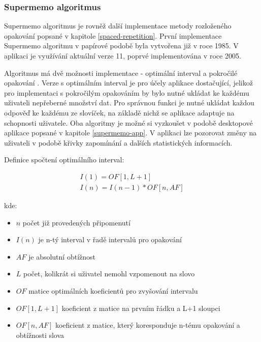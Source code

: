 \documentclass[a4paper,11pt,titlepage,fleqn]{article}
\begin{document}
        \subsubsection{Supermemo algoritmus}
            \label{supermemo}
            Supermemo algoritmus je rovněž další implementace metody rozloženého opakování popsané v kapitole \ref{spaced-repetition}. První implementace Supermemo algoritmu v papírové podobě byla vytvořena již v roce 1985. V aplikaci je využívání aktuální verze 11, poprvé implementována v roce 2005. 

            Algoritmus má dvě možnosti implementace - optimální interval a pokročilé opakování \cite{bib:supermemo}. Verze s optimálním interval je pro účely aplikace dostačující, jelikož pro implementaci s pokročilým opakováním by bylo nutné ukládat ke každému uživateli nepřeberné množství dat. Pro správnou funkci je nutné ukládat každou odpověď ke každému ze slovíček, na základě nichž se aplikace adaptuje na schopnosti uživatele. Oba algoritmy je možné si vyzkoušet v podobě desktopové aplikace popsané v kapitole \ref{supermemo-app}. V aplikaci lze pozorovat změny na uživateli v podobě křivky zapomínání a dalších statistických informacích. 

            Definice spočtení optimálního interval\cite{bib:supermemo}: 

                \begin{gather}
                    I(1)=OF[1,L+1]\label{eq:2}\\
                    I(n)=I(n-1)*OF[n,AF]
                \end{gather}

            kde:
                \begin{itemize}
                    \item $n$ počet již provedených připomenutí
                    \item $I(n)$ je n-tý interval v řadě intervalů pro opakování
                    \item $AF$ je absolutní obtížnost
                    \item $L$ počet, kolikrát si uživatel nemohl vzpomenout na slovo
                    \item $OF$ matice optimálních koeficientů pro zvyšování intervalu
                    \item $OF[1,L+1]$ koeficient z matice na prvním řádku a L+1 sloupci
                    \item $OF[n,AF]$ koeficient z matice, který koresponduje n-tému opakování a obtížnosti slova
                \end{itemize} 
\end{document}
